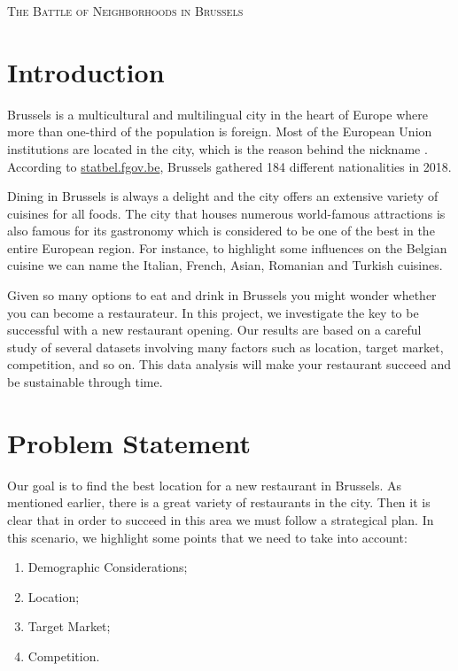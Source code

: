 \documentclass[a4paper,11pt]{amsart}
\begin{document}
\begin{tcolorbox}[center,colback=white]
\begin{center}
{\large\textsc{The Battle of Neighborhoods in Brussels}}\\
\end{center}
\end{tcolorbox}

\section{Introduction}

Brussels is a multicultural and multilingual city in the heart of Europe where more than one-third of the population is foreign. Most of the European Union institutions are located in the city, which is the reason behind the nickname . According to \href{https://statbel.fgov.be/en}{statbel.fgov.be}, Brussels gathered 184 different nationalities in 2018.

Dining in Brussels is always a delight and the city offers an extensive variety of cuisines for all foods. The city that houses numerous world-famous attractions is also famous for its gastronomy which is considered to be one of the best in the entire European region. For instance, to highlight some influences on the Belgian cuisine we can name the Italian, French, Asian, Romanian and Turkish cuisines.

Given so many options to eat and drink in Brussels you might wonder whether you can become a restaurateur. In this project, we investigate the key to be successful with a new restaurant opening. Our results are based on a careful study of several datasets involving many factors such as location, target market, competition, and so on. This data analysis will make your restaurant succeed and be sustainable through time.

\section{Problem Statement} 

Our goal is to find the best location for a new restaurant in Brussels. As mentioned earlier, there is a great variety of restaurants in the city. Then it is clear that in order to succeed in this area we must follow a strategical plan. In this scenario, we highlight some points that we need to take into account:
\begin{enumerate}[$\diamond$]
\item Demographic Considerations; 
\item Location;
\item Target Market;
\item Competition.
\end{enumerate}	
\end{document}
